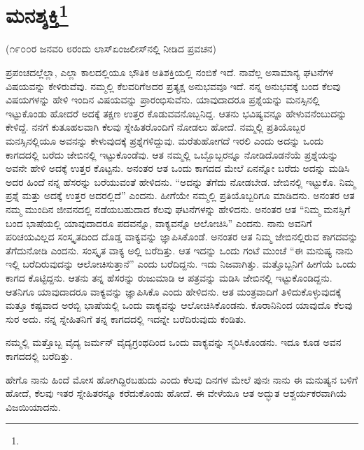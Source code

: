 
\chapter[ಮನಶ್ಶಕ್ತಿ]{ಮನಶ್ಶಕ್ತಿ\protect\footnote{}}

\begin{center}
(೧೯೦೦ರ ಜನವರಿ ೮ರಂದು ಲಾಸ್‌ಏಂಜಲೀಸ್‌ನಲ್ಲಿ ನೀಡಿದ ಪ್ರವಚನ)
\end{center}

ಪ್ರಪಂಚದಲ್ಲೆಲ್ಲಾ, ಎಲ್ಲಾ ಕಾಲದಲ್ಲಿಯೂ ಭೌತಿಕ ಅತಿಶಕ್ತಿಯಲ್ಲಿ ನಂಬಿಕೆ ಇದೆ. ನಾವೆಲ್ಲ ಅಸಾಮಾನ್ಯ ಘಟನೆಗಳ ವಿಷಯವನ್ನು ಕೇಳಿರುವೆವು. ನಮ್ಮಲ್ಲಿ ಕೆಲವರಿಗೆ\break ಅದರ ಪ್ರತ್ಯಕ್ಷ ಅನುಭವವೂ ಇದೆ. ನನ್ನ ಅನುಭವಕ್ಕೆ ಬಂದ ಕೆಲವು ವಿಷಯಗಳನ್ನು ಹೇಳಿ ಇಂದಿನ ವಿಷಯವನ್ನು ಪ್ರಾರಂಭಿಸುವೆನು. ಯಾವುದಾದರೂ ಪ್ರಶ್ನೆಯನ್ನು ಮನಸ್ಸಿನಲ್ಲಿ ಇಟ್ಟುಕೊಂಡು ಹೋದರೆ ಅದಕ್ಕೆ ತಕ್ಷಣ ಉತ್ತರ ಕೊಡುವವನೊಬ್ಬನಿದ್ದ. ಆತನು ಭವಿಷ್ಯವನ್ನೂ ಹೇಳುವನೆಂಬುದನ್ನು ಕೇಳಿದ್ದೆ. ನನಗೆ ಕುತೂಹಲವಾಗಿ ಕೆಲವು ಸ್ನೇಹಿತರೊಂದಿಗೆ ನೋಡಲು ಹೋದೆ. ನಮ್ಮಲ್ಲಿ ಪ್ರತಿಯೊಬ್ಬರ ಮನಸ್ಸಿನಲ್ಲಿಯೂ ಅವನನ್ನು ಕೇಳುವುದಕ್ಕೆ ಪ್ರಶ್ನೆಗಳಿದ್ದುವು. ಮರೆತುಹೋಗದೆ ಇರಲಿ ಎಂದು ಅದನ್ನು ಒಂದು ಕಾಗದದಲ್ಲಿ ಬರೆದು ಜೇಬಿನಲ್ಲಿ ಇಟ್ಟುಕೊಂಡೆವು. ಆತ ನಮ್ಮಲ್ಲಿ ಒಬ್ಬೊಬ್ಬರನ್ನೂ ನೋಡಿದೊಡನೆಯೆ ಪ್ರಶ್ನೆಯನ್ನು ಅವನೇ ಹೇಳಿ ಅದಕ್ಕೆ ಉತ್ತರ ಕೊಟ್ಟನು. ಅನಂತರ ಆತ ಒಂದು ಕಾಗದದ ಮೇಲೆ ಏನನ್ನೋ ಬರೆದು ಅದನ್ನು ಮಡಿಸಿ ಅದರ ಹಿಂದೆ ನನ್ನ ಹೆಸರನ್ನು ಬರೆಯುವಂತೆ ಹೇಳಿದನು. “ಅದನ್ನು ತೆಗೆದು ನೋಡಬೇಡ. ಜೇಬಿನಲ್ಲಿ ಇಟ್ಟುಕೊ. ನಿಮ್ಮ ಪ್ರಶ್ನೆ ಮತ್ತು ಅದಕ್ಕೆ ಉತ್ತರ ಅದರಲ್ಲಿದೆ'' ಎಂದನು. ಹೀಗೆಯೇ ನಮ್ಮಲ್ಲಿ ಪ್ರತಿಯೊಬ್ಬರಿಗೂ ಮಾಡಿದನು. ಅನಂತರ ಆತ ನಮ್ಮ ಮುಂದಿನ ಜೀವನದಲ್ಲಿ ನಡೆಯಬಹುದಾದ ಕೆಲವು ಘಟನೆಗಳನ್ನು ಹೇಳಿದನು. ಅನಂತರ ಆತ “ನಿಮ್ಮ ಮನಸ್ಸಿಗೆ ಬಂದ ಭಾಷೆಯಲ್ಲಿ ಯಾವುದಾದರೂ ಪದವನ್ನೊ, ವಾಕ್ಯವನ್ನೊ ಆಲೋಚಿಸಿ'' ಎಂದನು. ನಾನು ಅವನಿಗೆ ಪರಿಚಯವಿಲ್ಲದ ಸಂಸ್ಕೃತದಿಂದ ದೊಡ್ಡ ವಾಕ್ಯವನ್ನು ಜ್ಞಾಪಿಸಿಕೊಂಡೆ. ಅನಂತರ ಆತ ನಿಮ್ಮ ಜೇಬಿನಲ್ಲಿರುವ ಕಾಗದವನ್ನು ತೆಗೆದುನೋಡಿ ಎಂದನು. ಸಂಸ್ಕೃತ ವಾಕ್ಯ ಅಲ್ಲಿ ಬರೆದಿತ್ತು. ಆತ ಇದನ್ನು ಒಂದು ಗಂಟೆ ಮುಂಚೆ “ಈ ಮನುಷ್ಯ ನಾನು ಇಲ್ಲಿ ಬರೆದಿರುವುದನ್ನು ಆಲೋಚಿಸುತ್ತಾನೆ'' ಎಂದು ಬರೆದಿದ್ದನು. ಇದು ನಿಜವಾಗಿತ್ತು. ಮತ್ತೊಬ್ಬನಿಗೆ ಹೀಗೆಯೆ ಒಂದು ಕಾಗದ ಕೊಟ್ಟಿದ್ದನು. ಆತನು ತನ್ನ ಹೆಸರನ್ನು ರುಜುಮಾಡಿ ಆ ಪತ್ರವನ್ನು ಮಡಿಸಿ ಜೇಬಿನಲ್ಲಿ ಇಟ್ಟುಕೊಂಡಿದ್ದನು. ಆತನಿಗೂ ಯಾವುದಾದರೂ ವಾಕ್ಯವನ್ನು ಜ್ಞಾಪಿಸಿಕೊ ಎಂದು ಹೇಳಿದನು. ಆತ ಮಂತ್ರವಾದಿಗೆ ತಿಳಿದುಕೊಳ್ಳುವುದಕ್ಕೆ ಮತ್ತೂ ಕಷ್ಟವಾದ ಅರಬ್ಬಿ ಭಾಷೆಯಲ್ಲಿ ಒಂದು ವಾಕ್ಯವನ್ನು ಆಲೋಚಿಸಿಕೊಂಡನು. ಕೊರಾನಿನಿಂದ ಯಾವುದೊ ಕೆಲವು ಸುರ ಅದು. ನನ್ನ ಸ್ನೇಹಿತನಿಗೆ ತನ್ನ ಕಾಗದದಲ್ಲಿ ಇದನ್ನೇ ಬರೆದಿರುವುದು ಕಂಡಿತು.

ನಮ್ಮಲ್ಲಿ ಮತ್ತೊಬ್ಬ ವೈದ್ಯ ಜರ್ಮನ್ ವೈದ್ಯಗ್ರಂಥದಿಂದ ಒಂದು ವಾಕ್ಯವನ್ನು ಸ್ಮರಿಸಿಕೊಂಡನು. ಇದೂ ಕೂಡ ಅವನ ಕಾಗದದಲ್ಲಿ ಬರೆದಿತ್ತು.

\newpage

ಹೇಗೊ ನಾನು ಹಿಂದೆ ಮೋಸ ಹೋಗಿದ್ದಿರಬಹುದು ಎಂದು ಕೆಲವು ದಿನಗಳ ಮೇಲೆ ಪುನಃ ನಾನು ಈ ಮನುಷ್ಯನ ಬಳಿಗೆ ಹೋದೆ, ಕೆಲವು ಇತರ ಸ್ನೇಹಿತರನ್ನೂ ಕರೆದುಕೊಂಡು ಹೋದೆ. ಈ ವೇಳೆಯೂ ಆತ ಅದ್ಭುತ ಆಶ್ಚರ್ಯಕರವಾಗಿಯೆ ವಿಜಯಿಯಾದನು.

